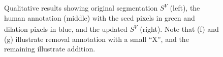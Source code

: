 \documentclass[]{spie}  %
\begin{document}
\begin{figure}[htbp]
 \hspace{1em}

\caption{Qualitative results showing original segmentation $S^V$
  (left), the human annotation (middle) with the seed pixels in green
  and dilation pixels in blue, and the updated $S^{\tilde{V}}$
  (right).  Note that (f) and (g) illustrate removal annotation with a
  small ``X'', and the remaining illustrate
  addition.} \label{fig:qual}
\end{figure}
\end{document}
